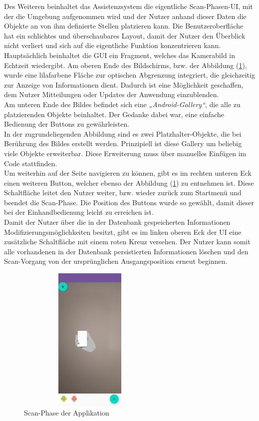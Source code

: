 Des Weiteren beinhaltet das Assistenzsystem die eigentliche Scan-Phasen-\acs{UI}, mit der die Umgebung aufgenommen wird und der Nutzer anhand dieser Daten 
die Objekte an von ihm definierte Stellen platzieren kann. Die Benutzeroberfläche hat ein schlichtes und überschaubares Layout, damit der Nutzer den 
Überblick nicht verliert und sich auf die eigentliche Funktion konzentrieren kann. 
\\ 
Hauptsächlich beinhaltet die \acs{GUI} ein Fragment, welches das Kamerabild in Echtzeit wiedergibt. Am oberen Ende des Bildschirms, bzw. der Abbildung 
(\ref{pic:scan}), wurde eine lilafarbene Fläche zur optischen Abgrenzung integriert, die gleichzeitig zur Anzeige von Informationen dient. Dadurch ist eine 
Möglichkeit geschaffen, dem Nutzer Mitteilungen oder Updates der Anwendung einzublenden. 
\\ 
Am unteren Ende des Bildes befindet sich eine \textit{„Android-Gallery“}, die alle zu platzierenden Objekte beinhaltet. Der Gedanke dabei war, eine einfache 
Bedienung der Buttons zu gewährleisten. 
\\ 
In der zugrundeliegenden Abbildung sind es zwei Platzhalter-Objekte, die bei Berührung des Bildes erstellt werden. 
Prinzipiell ist diese Gallery um beliebig viele Objekte erweiterbar. Diese Erweiterung muss über manuelles Einfügen im Code stattfinden. 
\\ 
\linebreak
Um weiterhin auf der Seite navigieren zu können, gibt es im rechten unteren Eck einen weiteren Button, welcher ebenso der Abbildung (\ref{pic:scan}) 
zu entnehmen ist. Diese Schaltfläche leitet den Nutzer weiter, bzw. wieder zurück zum Startmenü und beendet die Scan-Phase. Die Position des Buttons wurde so 
gewählt, damit dieser bei der Einhandbedienung leicht zu erreichen ist. 
\\ 
\linebreak
Damit der Nutzer über die in der Datenbank gespeicherten Informationen Modifizierungsmöglichkeiten besitzt, gibt es im linken oberen Eck der \acs{UI} eine 
zusätzliche Schaltfläche mit einem roten Kreuz versehen. Der Nutzer kann somit alle vorhandenen in der Datenbank persistierten Informationen löschen 
und den Scan-Vorgang von der ursprünglichen Ausgangsposition erneut beginnen. 
\begin{figure}[hbt!]
    \centering
    \includegraphics[width=7cm,height=7cm,keepaspectratio]{4Umsetzung/Bilder/scan-phase.jpg}
    \caption{Scan-Phase der Applikation}
    \label{pic:scan}
\end{figure}
